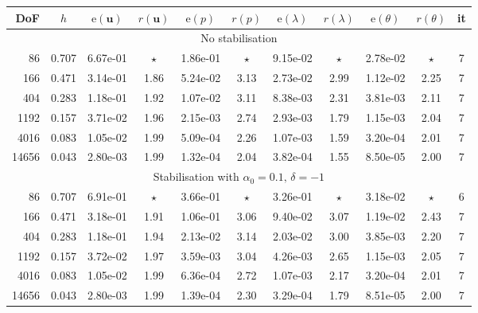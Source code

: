 \documentclass[onefignum,onetabnum,reqno,a4paper,final]{siamart250211}
\newcommand\bu{\boldsymbol{u}}
\newcommand\0{\mathbf{0}}
\numberwithin{figure}{section}
\numberwithin{table}{section}
\begin{document}
{%
\begin{table}[t!]
    \setlength{\tabcolsep}{3.5pt}
    \centering 
    {\small\begin{tabular}{|rcccccccccc|}
            \hline\hline
            DoF   &   $h$  & $\mathrm{e}(\bu)$  &   $r(\bu)$   &   $\mathrm{e}(p)$  &   $r(p)$  &  $\mathrm{e}(\lambda)$  &   $r(\lambda) $ &  $\mathrm{e}(\theta)$  &  $r(\theta)$  &   it \\
            \hline 
            \multicolumn{11}{|c|}{No stabilisation} \\
            \hline
            86 & 0.707 & 6.67e-01 & $\star$ & 1.86e-01 & $\star$ & 9.15e-02 & $\star$ & 2.78e-02 & $\star$ &  7 \\
            166 & 0.471 & 3.14e-01 & 1.86 & 5.24e-02 & 3.13 & 2.73e-02 & 2.99 & 1.12e-02 & 2.25 &  7 \\
            404 & 0.283 & 1.18e-01 & 1.92 & 1.07e-02 & 3.11 & 8.38e-03 & 2.31 & 3.81e-03 & 2.11 &  7 \\
            1192 & 0.157 & 3.71e-02 & 1.96 & 2.15e-03 & 2.74 & 2.93e-03 & 1.79 & 1.15e-03 & 2.04 &  7 \\
            4016 & 0.083 & 1.05e-02 & 1.99 & 5.09e-04 & 2.26 & 1.07e-03 & 1.59 & 3.20e-04 & 2.01 &  7 \\
            14656 & 0.043 & 2.80e-03 & 1.99 & 1.32e-04 & 2.04 & 3.82e-04 & 1.55 & 8.50e-05 & 2.00 &  7 \\
            \hline 
            \multicolumn{11}{|c|}{Stabilisation with $\alpha_0=0.1,\,\delta=-1$} \\
            \hline
            86 & 0.707 & 6.91e-01 & $\star$ & 3.66e-01 & $\star$ & 3.26e-01 & $\star$ & 3.18e-02 & $\star$ &  6\\
   166 & 0.471 & 3.18e-01 & 1.91 & 1.06e-01 & 3.06 & 9.40e-02 & 3.07 & 1.19e-02 & 2.43 &  7\\
   404 & 0.283 & 1.18e-01 & 1.94 & 2.13e-02 & 3.14 & 2.03e-02 & 3.00 & 3.85e-03 & 2.20 &  7\\
  1192 & 0.157 & 3.72e-02 & 1.97 & 3.59e-03 & 3.04 & 4.26e-03 & 2.65 & 1.15e-03 & 2.05 &  7\\
  4016 & 0.083 & 1.05e-02 & 1.99 & 6.36e-04 & 2.72 & 1.07e-03 & 2.17 & 3.20e-04 & 2.01 &  7\\
 14656 & 0.043 & 2.80e-03 & 1.99 & 1.39e-04 & 2.30 & 3.29e-04 & 1.79 & 8.51e-05 & 2.00 &  7\\

\end{tabular}}
\end{table}}
\end{document}
